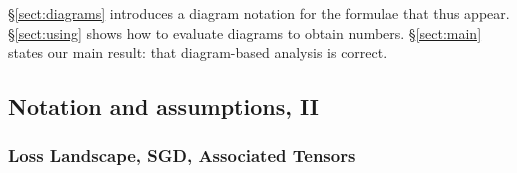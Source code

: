 

        \S\ref{sect:diagrams} introduces a diagram
        notation for the formulae that thus appear.  \S\ref{sect:using} shows
        how to evaluate diagrams to obtain numbers.  \S\ref{sect:main} states
        our main result: that diagram-based analysis is correct.

        \subsection{Notation and assumptions, II}\label{sect:background}


            \subsubsection{Loss Landscape, SGD, Associated Tensors}

